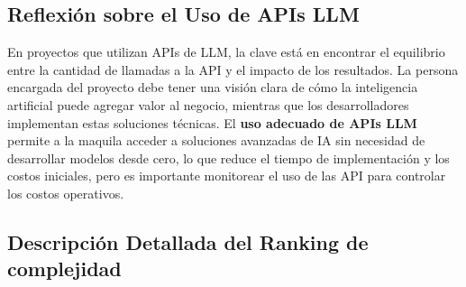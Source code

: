 \begin{table}[H]
\centering
\caption{Costos del Proyecto con Uso de APIs LLM}
\end{table}

\subsection{Reflexión sobre el Uso de APIs LLM}

En proyectos que utilizan APIs de LLM, la clave está en encontrar el equilibrio entre la cantidad de llamadas a la API y el impacto de los resultados. La persona encargada del proyecto debe tener una visión clara de cómo la inteligencia artificial puede agregar valor al negocio, mientras que los desarrolladores implementan estas soluciones técnicas. El \textbf{uso adecuado de APIs LLM} permite a la maquila acceder a soluciones avanzadas de IA sin necesidad de desarrollar modelos desde cero, lo que reduce el tiempo de implementación y los costos iniciales, pero es importante monitorear el uso de las API para controlar los costos operativos.


\subsection{Descripción Detallada del Ranking de complejidad}

